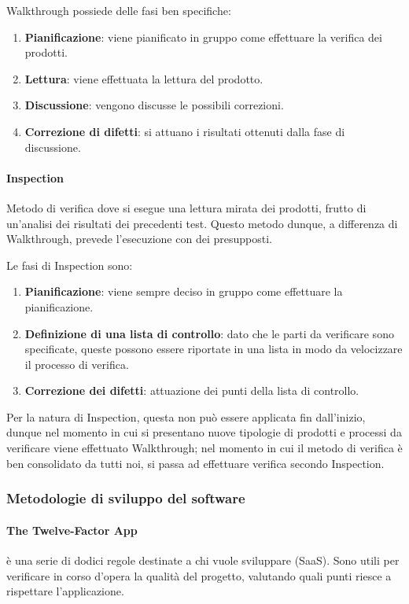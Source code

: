 			Walkthrough possiede delle fasi ben specifiche:

			\begin{enumerate}
				\item \textbf{Pianificazione}: viene pianificato in gruppo come effettuare la verifica dei prodotti.
				\item \textbf{Lettura}: viene effettuata la lettura del prodotto.
				\item \textbf{Discussione}: vengono discusse le possibili correzioni.
				\item \textbf{Correzione di difetti}: si attuano i risultati ottenuti dalla fase di discussione.
			\end{enumerate}

			\paragraph{Inspection}
			Metodo di verifica dove si esegue una lettura mirata dei prodotti, frutto di un'analisi dei risultati dei precedenti test.
			Questo metodo dunque, a differenza di Walkthrough, prevede l'esecuzione con dei presupposti.
	
			Le fasi di Inspection sono:
	
			\begin{enumerate}
				\item \textbf{Pianificazione}: viene sempre deciso in gruppo come effettuare la pianificazione.
				\item \textbf{Definizione di una lista di controllo}: dato che le parti da verificare sono specificate, queste possono essere
				riportate in una lista in modo da velocizzare il processo di verifica.
				\item \textbf{Correzione dei difetti}: attuazione dei punti della lista di controllo.
			\end{enumerate}
	
			Per la natura di Inspection, questa non può essere applicata fin dall'inizio, dunque nel momento in cui si presentano nuove tipologie di
			prodotti e processi da verificare viene effettuato Walkthrough; nel momento in cui il metodo di verifica è ben consolidato da tutti noi,
			si passa ad effettuare verifica secondo Inspection.	

		\subsubsection{Metodologie di sviluppo del software}

		\paragraph{The Twelve-Factor App}
		 è una serie di dodici regole destinate a chi vuole sviluppare  (SaaS). Sono utili per verificare in corso d'opera la qualità del progetto, valutando quali punti riesce a rispettare l'applicazione.
		

